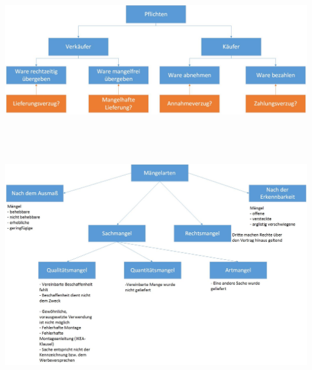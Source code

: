 \includegraphics[scale=0.4]{pictures/lf01-pic/lf01-Pflichten_Kaufvertrag.jpg}\\
\\ \\ \\ \\
\includegraphics[scale=0.4]{pictures/lf01-pic/lf01-Maengelarten.jpg}\\


